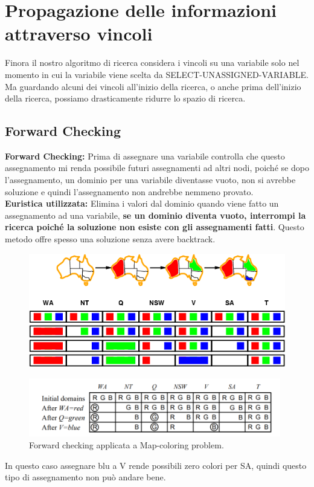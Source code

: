 \section{Propagazione delle informazioni attraverso vincoli}
Finora il nostro algoritmo di ricerca considera i vincoli su una variabile solo
nel momento in cui la variabile viene scelta da SELECT-UNASSIGNED-VARIABLE. Ma
guardando alcuni dei vincoli all'inizio della ricerca, o anche prima dell'inizio
della ricerca, possiamo drasticamente ridurre lo spazio di ricerca.
\subsection{Forward Checking}
\textbf{Forward Checking: }  Prima di assegnare una variabile controlla che
questo assegnamento mi renda possibile futuri assegnamenti ad altri nodi, poiché
se dopo l'assegnamento, un dominio per una variabile diventasse vuoto, non si
avrebbe soluzione e quindi l'assegnamento non andrebbe nemmeno provato.
\\\textbf{Euristica utilizzata: }  Elimina i valori dal dominio quando viene
fatto un assegnamento ad una variabile, \textbf{se un dominio diventa vuoto,
    interrompi la ricerca poiché la soluzione non esiste con gli assegnamenti
    fatti}. Questo metodo offre spesso una soluzione senza avere backtrack.
\begin{figure}[htp]
    \centering
    \includegraphics[width=12cm, keepaspectratio]{img/Cap2/forwod1.png}
\end{figure}
\begin{figure}[htp]
    \centering
    \includegraphics[width=11cm, keepaspectratio]{img/Cap2/f2.png}
    \caption{Forward checking applicata a Map-coloring problem.}
\end{figure}
\newpage
In questo caso assegnare blu a V rende possibili zero colori per SA, quindi
questo tipo di assegnamento non può andare bene.
